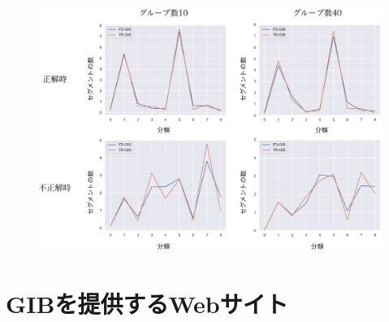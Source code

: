 \documentclass{kuee}
\begin{document}
\begin{figure}[t]
  \begin{center}
  \includegraphics[width=15cm]{./images/taxonomy-result.png}
  \caption{}
  \label{fig:taxonomy-result}
  \end{center}
\end{figure}








\section{GIBを提供するWebサイト}

\begin{acknowledgements}

\end{acknowledgements}








\appendix
\end{document}
